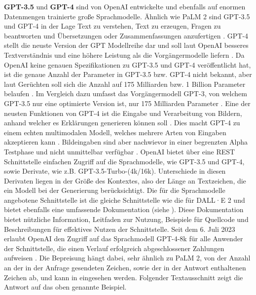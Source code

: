 \textbf{GPT-3.5} \cite{openai-gpt-sep-2021} und \textbf{GPT-4} \cite{openai-gpt-sep-2021} sind von OpenAI entwickelte und ebenfalls auf enormen Datenmengen trainierte große Sprachmodelle.
Ähnlich wie PaLM 2 sind GPT-3.5 und GPT-4 in der Lage Text zu verstehen, Text zu erzeugen, Fragen zu beantworten und Übersetzungen oder Zusammenfassungen anzufertigen \cite{gpt3-paper}.
GPT-4 stellt die neuste Version der GPT Modellreihe dar und soll laut OpenAI besseres Textverständnis und eine höhere Leistung als die Vorgängermodelle liefern \cite{openai-gpt-4-announcement}.
Da OpenAI keine genauen Spezifikationen zu GPT-3.5 und GPT-4 veröffentlicht hat, ist die genaue Anzahl der Parameter in GPT-3.5 bzw. GPT-4 nicht bekannt, aber laut Gerüchten soll sich die Anzahl auf 175 Milliarden bzw. 1 Billion Parameter belaufen \cite{decoder-gpt-4-parameter-count}.
Im Vergleich dazu umfasst das Vorgängermodell GPT-3, von welchem GPT-3.5 nur eine optimierte Version ist, nur 175 Milliarden Parameter \cite{gpt3-paper}.
Eine der neusten Funktionen von GPT-4 ist die Eingabe und Verarbeitung von Bildern, anhand welcher es Erklärungen generieren können soll \cite{openai-gpt-4-announcement}.
Dies macht GPT-4 zu einem echten multimodalen Modell, welches mehrere Arten von Eingaben akzeptieren kann \cite{openai-gpt-4-announcement}.
Bildeingaben sind aber nachwievor in einer begrenzten Alpha Testphase und nicht unmittelbar verfügbar \cite{openai-gpt-4-announcement}.
OpenAI bietet über eine REST Schnittstelle einfachen Zugriff auf die Sprachmodelle, wie GPT-3.5 und GPT-4, sowie Derivate, wie z.B. GPT-3.5-Turbo-(4k/16k).
Unterschiede in diesen Derivaten liegen in der Größe des Kontextes, also der Länge an Textzeichen, die ein Modell bei der Generierung berücksichtigt.
Die für die Sprachmodelle angebotene Schnittstelle ist die gleiche Schnittstelle wie die für DALL·E 2 und bietet ebenfalls eine umfassende Dokumentation (siehe \cite{openai-api-doc}).
Diese Dokumentation bietet nützliche Information, Leitfaden zur Nutzung, Beispiele für Quellcode und Beschreibungen für effektives Nutzen der Schnittstelle.
Seit dem 6. Juli 2023 erlaubt OpenAI den Zugriff auf das Sprachmodell GPT-4-8k für alle Anwender der Schnittstelle, die einen Verlauf erfolgreich abgeschlossener Zahlungen aufweisen \cite{openai-gpt4-access}.
Die Bepreisung hängt dabei, sehr ähnlich zu PaLM 2, von der Anzahl an der in der Anfrage gesendeten Zeichen, sowie der in der Antwort enthaltenen Zeichen ab, und kann in \cite{openai-pricing} eingesehen werden.
Folgender Textausschnitt zeigt die Antwort auf das oben genannte Beispiel.
